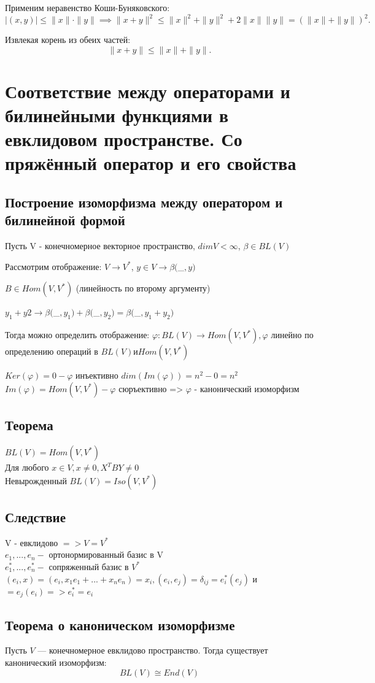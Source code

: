 \documentclass[12pt]{article}
\begin{document}
Применим неравенство Коши-Буняковского:
\[
|(x, y)| \leq \|x\| \cdot \|y\| \implies \|x + y\|^2 \leq \|x\|^2 + \|y\|^2 + 2 \|x\| \|y\| = (\|x\| + \|y\|)^2.
\]

Извлекая корень из обеих частей:
\[
\|x + y\| \leq \|x\| + \|y\|.
\]

\section{Соответствие между операторами и билинейными функциями в евклидовом пространстве. Со
пряжённый оператор и его свойства}

\subsection*{Построение изоморфизма между оператором и билинейной формой}

Пусть V - конечномерное векторное пространство, $dim V < \infty$, $\beta \in BL(V)$

Рассмотрим отображение: $V \to V^*$, $y \in V \to \beta( $_$ , y)$

$B \in Hom(V, V^*)$ (линейность по второму аргументу)

$y_1 + y2 \to \beta($_$, y_1) + \beta($_$, y_2) = \beta($_$, y_1 + y_2)$

Тогда можно определить отображение:
$\varphi: BL(V) \to Hom(V, V^*), \varphi$ линейно по определению операций в $BL(V) и Hom(V,V^*)$ 

$Ker(\varphi) = {0} - \varphi$ инъективно 
$dim(Im(\varphi)) = n^2 - 0 = n^2$
$Im(\varphi) = Hom(V,V^*) - \varphi$ сюръективно => $\varphi$ - канонический изоморфизм

\subsection*{Теорема}
$BL(V) = Hom(V, V^*)$
\[\]
Для любого $ x \in V, x \ne 0, X^TBY \ne 0$
\[\]
Невырожденный $BL(V) = Iso(V,V^*)$

\subsection*{Следствие}
V - евклидово $=> V = V ^*$
\[\]
$e_1,...,e_n -$ ортонормированный базис в V
\[\]
$e_1^*,...,e_n^* -$ сопряженный базис в $V^*$
\[\]
$(e_i, x) = (e_i, x_1e_1 + ...+x_ne_n) = x_i, (e_i,e_j) = \delta _{ij} = e_i^*(e_j)$ и $=e_j(e_i) => e_i^* = e_i$

\subsection*{Теорема о каноническом изоморфизме}
Пусть $V$ — конечномерное евклидово пространство. Тогда существует канонический изоморфизм:
\[
BL(V) \cong End(V)
\]
\end{document}
